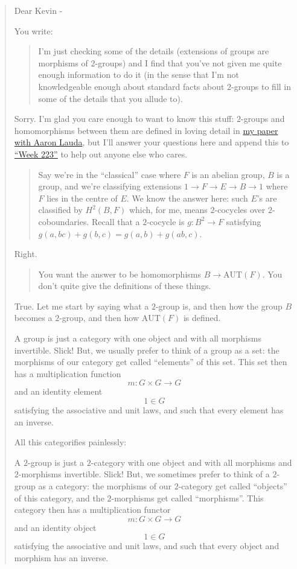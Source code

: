 \documentclass{article}
\begin{document}
\begin{quote}
Dear Kevin -

You write:

\begin{quote}
I'm just checking some of the details (extensions of groups are
morphisms of \(2\)-groups) and I find that you've not given me quite
enough information to do it (in the sense that I'm not knowledgeable
enough about standard facts about \(2\)-groups to fill in some of the
details that you allude to).
\end{quote}

Sorry. I'm glad you care enough to want to know this stuff: \(2\)-groups
and homomorphisms between them are defined in loving detail in
\href{http://arxiv.org/abs/math.QA/0307200}{my paper with Aaron Lauda},
but I'll answer your questions here and append this to
\protect\hyperlink{week223}{``Week 223''} to help out anyone else who
cares.

\begin{quote}
Say we're in the ``classical'' case where \(F\) is an abelian group,
\(B\) is a group, and we're classifying extensions
\(1\to F\to E\to B\to1\) where \(F\) lies in the centre of \(E\). We
know the answer here: such \(E\)'s are classified by \(H^2(B,F)\) which,
for me, means \(2\)-cocycles over \(2\)-coboundaries. Recall that a
\(2\)-cocycle is \(g\colon B^2\to F\) satisfying
\(g(a,bc)+g(b,c)=g(a,b)+g(ab,c)\).
\end{quote}

Right.

\begin{quote}
You want the answer to be homomorphisms \(B \to \mathrm{AUT}(F)\). You
don't quite give the definitions of these things.
\end{quote}

True. Let me start by saying what a \(2\)-group is, and then how the
group \(B\) becomes a \(2\)-group, and then how \(\mathrm{AUT}(F)\) is
defined.

A group is just a category with one object and with all morphisms
invertible. Slick! But, we usually prefer to think of a group as a set:
the morphisms of our category get called ``elements'' of this set. This
set then has a multiplication function \[m\colon G \times G \to G\] and
an identity element \[1 \in G\] satisfying the associative and unit
laws, and such that every element has an inverse.

All this categorifies painlessly:

A \(2\)-group is just a \(2\)-category with one object and with all
morphisms and \(2\)-morphisms invertible. Slick! But, we sometimes
prefer to think of a \(2\)-group as a category: the morphisms of our
\(2\)-category get called ``objects'' of this category, and the
\(2\)-morphisms get called ``morphisms''. This category then has a
multiplication functor \[m\colon G \times G \to G\] and an identity
object \[1 \in G\] satisfying the associative and unit laws, and such
that every object and morphism has an inverse.


\end{quote}
\end{document}
